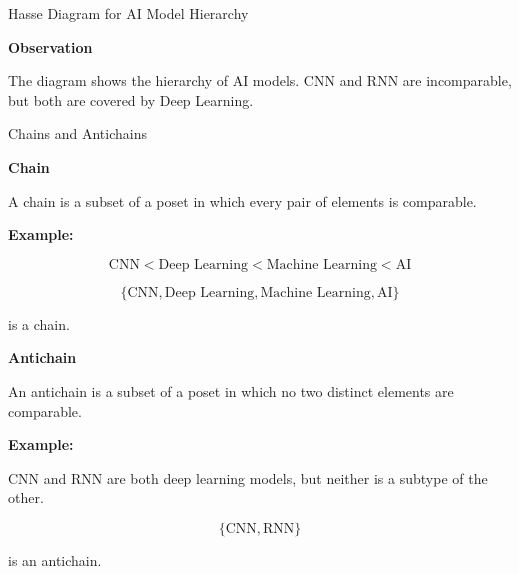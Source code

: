 \documentclass{beamer}
\begin{document}
\begin{frame}{Hasse Diagram for AI Model Hierarchy}

\small

\centering


\vspace{0.3cm}

\textbf{Observation}

The diagram shows the hierarchy of AI models. CNN and RNN are incomparable,
but both are covered by Deep Learning.

\end{frame}
\begin{frame}{Chains and Antichains}

\small

\textbf{Chain}

A chain is a subset of a poset in which every pair of elements is comparable.

\textbf{Example:}

\[
\text{CNN}<\text{Deep Learning}
<\text{Machine Learning}<\text{AI}
\]

\[
\{\text{CNN},\text{Deep Learning},\text{Machine Learning},\text{AI}\}
\]

is a chain.

\vspace{0.2cm}

\textbf{Antichain}

An antichain is a subset of a poset in which no two distinct elements
are comparable.

\textbf{Example:}

CNN and RNN are both deep learning models, but neither is a subtype
of the other.

\[
\{\text{CNN},\text{RNN}\}
\]

is an antichain.

\end{frame}
\end{document}
